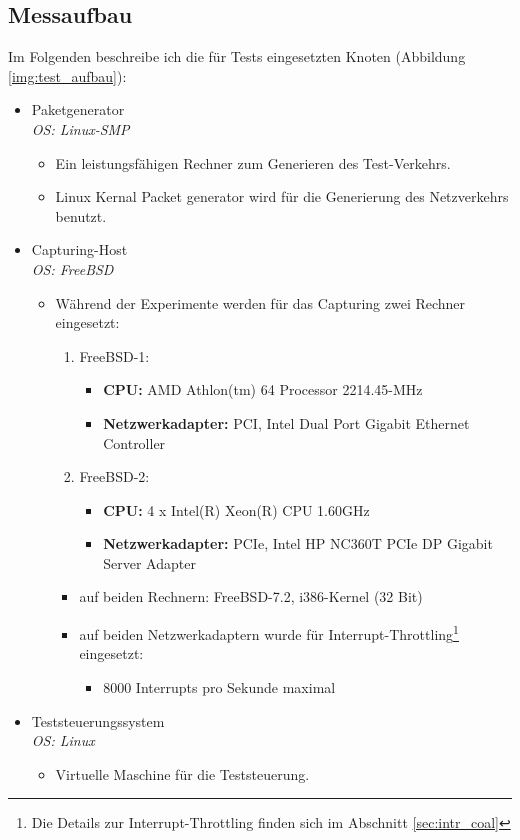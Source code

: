 \subsection{Messaufbau}\label{sec:messaufbau}
Im Folgenden beschreibe ich die für Tests eingesetzten Knoten (Abbildung
\ref{img:test_aufbau}): 
\begin{itemize}
	\item Paketgenerator \\ \emph{OS: Linux-SMP}
		\begin{itemize}
			\item Ein leistungsfähigen Rechner zum Generieren des Test-Verkehrs.
			\item Linux Kernal Packet generator wird für die Generierung des
				Netzverkehrs benutzt.
		\end{itemize}
	\item Capturing-Host \\ \emph{OS: FreeBSD}
		\begin{itemize}
			\item Während der Experimente werden für das Capturing zwei Rechner eingesetzt: 
				\begin{enumerate}
					\item FreeBSD-1:
						\begin{itemize}
							\item \textbf{CPU:} AMD Athlon(tm) 64 Processor 2214.45-MHz
							\item \textbf{Netzwerkadapter:} PCI, Intel Dual Port Gigabit Ethernet Controller
						\end{itemize}
					\item FreeBSD-2:
						\begin{itemize}
							\item \textbf{CPU:} 4 x Intel(R) Xeon(R) CPU 1.60GHz
							\item \textbf{Netzwerkadapter:} PCIe, Intel HP NC360T PCIe DP Gigabit Server Adapter	 
						\end{itemize}
				\end{enumerate}
				\begin{itemize}
					\item auf beiden Rechnern: FreeBSD-7.2, i386-Kernel (32 Bit)
					\item auf beiden Netzwerkadaptern wurde für
						Interrupt-Throttling\footnote{Die Details
						zur Interrupt-Throttling finden sich im  Abschnitt
						\ref{sec:intr_coal}} eingesetzt:
						\begin{itemize}
							\item 8000 Interrupts pro Sekunde maximal
						\end{itemize}
				\end{itemize}
		\end{itemize}
	\item Teststeuerungssystem \\ \emph{OS: Linux}
		\begin{itemize}
			\item Virtuelle Maschine für die Teststeuerung.
		\end{itemize}
\end{itemize}
